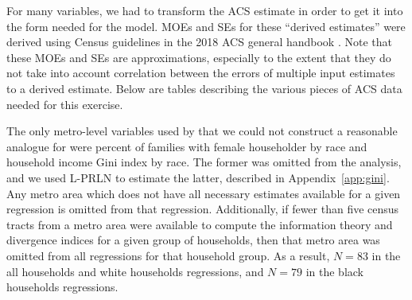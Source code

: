 \documentclass[12pt]{article}
\begin{document}
For many variables, we had to transform the ACS estimate in order to get it into the form needed for the model. MOEs and SEs for these ``derived estimates'' were derived using Census guidelines in the 2018 ACS general handbook \citep{us2018understanding}. Note that these MOEs and SEs are approximations, especially to the extent that they do not take into account correlation between the errors of multiple input estimates to a derived estimate. Below are tables describing the various pieces of ACS data needed for this exercise.

The only metro-level variables used by \citet{reardon2011income} that we could not construct a reasonable analogue for were percent of families with female householder by race and household income Gini index by race. The former was omitted from the analysis, and we used L-PRLN to estimate the latter, described in Appendix~\ref{app:gini}. Any metro area which does not have all necessary estimates available for a given regression is omitted from that regression. Additionally, if fewer than five census tracts from a metro area were available to compute the information theory and divergence indices for a given group of households, then that metro area was omitted from all regressions for that household group. As a result, $N=83$ in the all households and white households regressions, and $N=79$ in the black households regressions.
\end{document}
